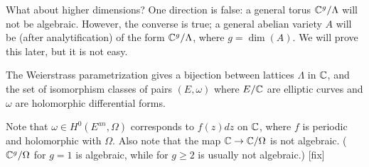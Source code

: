 What about higher dimensions? One direction is false: a general torus ${\mathbb C}^g/\Lambda$ will not be algebraic. However, the converse is true; a general abelian variety $A$ will be (after analytification) of the form ${\mathbb C}^g/\Lambda$, where $g=\dim(A)$. We will prove this later, but it is not easy. 

\begin{theorem}
The Weierstrass parametrization gives a bijection between lattices $\Lambda$ in ${\mathbb C}$, and the set of isomorphism classes of pairs $(E,\omega)$ where $E/{\mathbb C}$ are elliptic curves and $\omega$ are holomorphic differential forms. 
\end{theorem}

Note that $\omega\in H^0(E^{an},\Omega)$ corresponds to $f(z)dz$ on ${\mathbb C}$, where $f$ is periodic and holomorphic with $\Omega$. 
Also note that the map ${\mathbb C}\to {\mathbb C}/\Omega$ is not algebraic. (${\mathbb C}^g/\Omega$ for $g=1$ is algebraic, while for $g\geq 2$ is usually not algebraic.) [fix]